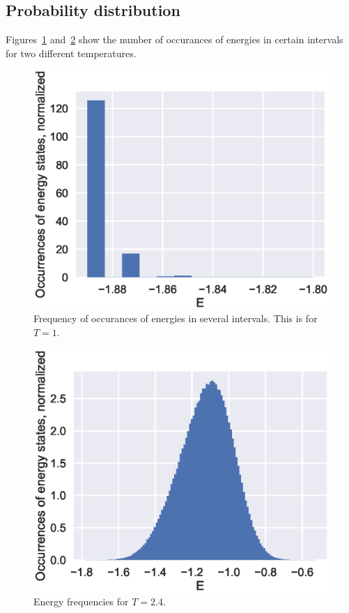 \documentclass[aps,reprint]{revtex4-1}
\begin{document}
\subsection{Probability distribution}
Figures~\ref{fig:4da} and~\ref{fig:4db} show the number of occurances of energies
in certain intervals for two different temperatures.
\begin{figure}
  \includegraphics[width=\columnwidth]{figures/4da.eps}
  \caption{Frequency of occurances of energies in several intervals. This is
  for $T = 1$.}
  \label{fig:4da}
\end{figure}
\begin{figure}
  \includegraphics[width=\columnwidth]{figures/4db.eps}
  \caption{Energy frequencies for $T = 2.4$.}
  \label{fig:4db}
\end{figure}
\end{document}
